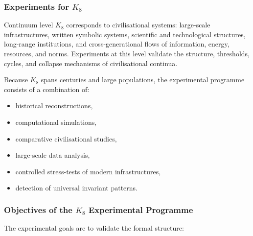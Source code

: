 
\subsubsection{Experiments for \texorpdfstring{$K_8$}{K_8}}
\label{sec:experiments-k8}

Continuum level $K_8$ corresponds to civilisational systems:
large-scale infrastructures, written symbolic systems, scientific
and technological structures, long-range institutions, and 
cross-generational flows of information, energy, resources, and norms.  
Experiments at this level validate the structure, thresholds,
cycles, and collapse mechanisms of civilisational continua.

Because $K_8$ spans centuries and large populations, the
experimental programme consists of a combination of:
\begin{itemize}
    \item historical reconstructions,
    \item computational simulations,
    \item comparative civilisational studies,
    \item large-scale data analysis,
    \item controlled stress-tests of modern infrastructures,
    \item detection of universal invariant patterns.
\end{itemize}



\subsubsection{Objectives of the \texorpdfstring{$K_8$}{K_8} Experimental Programme}

The experimental goals are to validate the formal structure:

